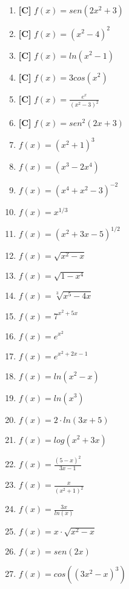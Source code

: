 \begin{enumerate}[topsep=0pt]
	\item \textbf{[C]} $ f(x) = sen(2x^2 + 3) $
	\item \textbf{[C]} $ f(x) = (x^2 - 4)^2 $
	\item \textbf{[C]} $ f(x) = ln(x^2-1) $
	\item \textbf{[C]} $ f(x) = 3 cos(x^2) $
	\item \textbf{[C]} $ f(x) = \frac{e^x}{(x^2-3)^2} $
	\item \textbf{[C]} $ f(x) = sen^2(2x+3) $
	\item $ f(x) =  (x^2+1)^3$
	\item $ f(x) =  (x^3-2x^4)$
	\item $ f(x) =  (x^4 +x^2 -3)^{-2}$
	\item $ f(x) =  x^{1/3}$
	\item $ f(x) =  (x^2+3x-5)^{1/2}$
	\item $ f(x) =  \sqrt{x^2-x}$
	\item $ f(x) =  \sqrt{1-x^4}$
	\item $ f(x) =  \sqrt[3]{x^5-4x}$
	\item $ f(x) =  7^{x^2+5x}$
	\item $ f(x) =  e^{x^2}$
	\item $ f(x) =  e^{x^2+2x-1}$
	\item $ f(x) =  ln(x^2-x)$
	\item $ f(x) =  ln(x^3)$
	\item $ f(x) =  2 \cdot ln(3x+5)$
	\item $ f(x) =  log(x^2+3x)$
	\item $ f(x) =  \frac{(5-x)^2}{3x-1}$
	\item $ f(x) =  \frac{x}{(x^2+1)^2}$
	\item $ f(x) =  \frac{3x}{ln(x)}$
	\item $ f(x) =  x \cdot \sqrt{x^2-x}$
	\item $ f(x) =  sen(2x)$
	\item $ f(x) =  cos((3x^2 -x)^3)$
\end{enumerate}
